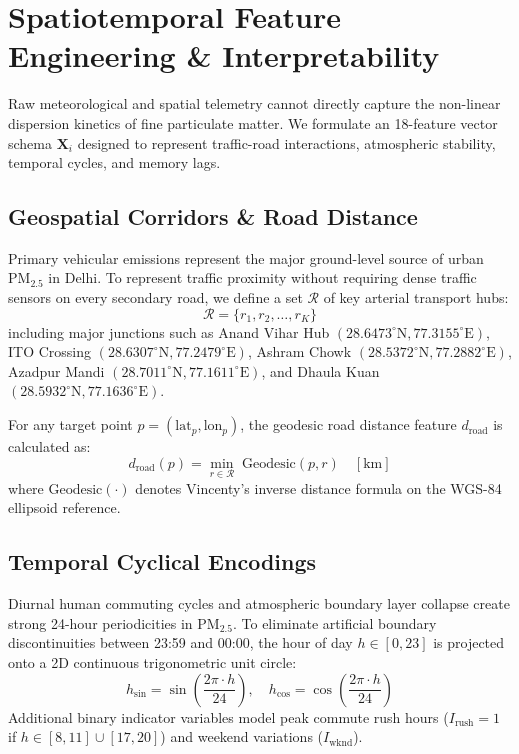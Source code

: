 \documentclass[journal]{IEEEtran}
\begin{document}
\section{Spatiotemporal Feature Engineering \& Interpretability}
Raw meteorological and spatial telemetry cannot directly capture the non-linear dispersion kinetics of fine particulate matter. We formulate an 18-feature vector schema $\mathbf{X}_i$ designed to represent traffic-road interactions, atmospheric stability, temporal cycles, and memory lags.

\subsection{Geospatial Corridors \& Road Distance}
Primary vehicular emissions represent the major ground-level source of urban $\text{PM}_{2.5}$ in Delhi. To represent traffic proximity without requiring dense traffic sensors on every secondary road, we define a set $\mathcal{R}$ of key arterial transport hubs:
\begin{equation}
\mathcal{R} = \{r_1, r_2, \dots, r_K\}
\end{equation}
including major junctions such as Anand Vihar Hub $(28.6473^\circ\text{N}, 77.3155^\circ\text{E})$, ITO Crossing $(28.6307^\circ\text{N}, 77.2479^\circ\text{E})$, Ashram Chowk $(28.5372^\circ\text{N}, 77.2882^\circ\text{E})$, Azadpur Mandi $(28.7011^\circ\text{N}, 77.1611^\circ\text{E})$, and Dhaula Kuan $(28.5932^\circ\text{N}, 77.1636^\circ\text{E})$.

For any target point $p = (\text{lat}_p, \text{lon}_p)$, the geodesic road distance feature $d_{\text{road}}$ is calculated as:
\begin{equation}
d_{\text{road}}(p) = \min_{r \in \mathcal{R}} \; \text{Geodesic}(p, r) \quad [\text{km}]
\end{equation}
where $\text{Geodesic}(\cdot)$ denotes Vincenty's inverse distance formula on the WGS-84 ellipsoid reference.

\subsection{Temporal Cyclical Encodings}
Diurnal human commuting cycles and atmospheric boundary layer collapse create strong 24-hour periodicities in $\text{PM}_{2.5}$. To eliminate artificial boundary discontinuities between 23:59 and 00:00, the hour of day $h \in [0, 23]$ is projected onto a 2D continuous trigonometric unit circle:
\begin{equation}
h_{\text{sin}} = \sin\left(\frac{2\pi \cdot h}{24}\right), \quad h_{\text{cos}} = \cos\left(\frac{2\pi \cdot h}{24}\right)
\end{equation}
Additional binary indicator variables model peak commute rush hours ($I_{\text{rush}} = 1$ if $h \in [8, 11] \cup [17, 20]$) and weekend variations ($I_{\text{wknd}}$).
\end{document}
